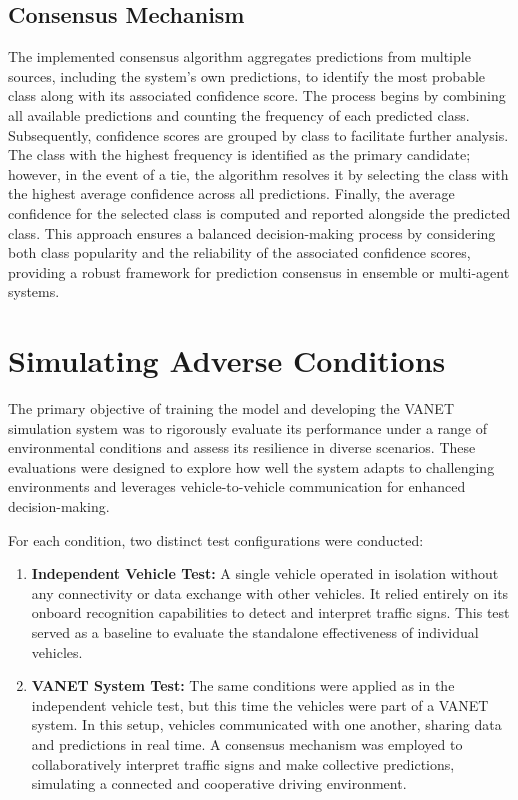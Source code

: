 \subsection{Consensus Mechanism}
The implemented consensus algorithm aggregates predictions from multiple sources, including the system's own predictions, 
to identify the most probable class along with its associated confidence score. The process begins by combining all available 
predictions and counting the frequency of each predicted class. Subsequently, confidence scores are grouped by class to 
facilitate further analysis. The class with the highest frequency is identified as the primary candidate; however, 
in the event of a tie, the algorithm resolves it by selecting the class with the highest average confidence across
 all predictions. Finally, the average confidence for the selected class is computed and reported alongside the predicted class.
  This approach ensures a balanced decision-making process by considering both class popularity and the reliability of
   the associated confidence scores, providing a robust framework for prediction consensus in ensemble or multi-agent systems.

   \newpage
   \section{Simulating Adverse Conditions}

   The primary objective of training the model and developing the VANET simulation system was to rigorously evaluate its performance under a range of environmental conditions and assess its resilience in diverse scenarios. These evaluations were designed to explore how well the system adapts to challenging environments and leverages vehicle-to-vehicle communication for enhanced decision-making.
   
   For each condition, two distinct test configurations were conducted:
   
   \begin{enumerate}
       \item \textbf{Independent Vehicle Test:} A single vehicle operated in isolation without any connectivity or data exchange with other vehicles. It relied entirely on its onboard recognition capabilities to detect and interpret traffic signs. This test served as a baseline to evaluate the standalone effectiveness of individual vehicles.
       
       \item \textbf{VANET System Test:} The same conditions were applied as in the independent vehicle test, but this time the vehicles were part of a VANET system. In this setup, vehicles communicated with one another, sharing data and predictions in real time. A consensus mechanism was employed to collaboratively interpret traffic signs and make collective predictions, simulating a connected and cooperative driving environment.
   \end{enumerate}
   
